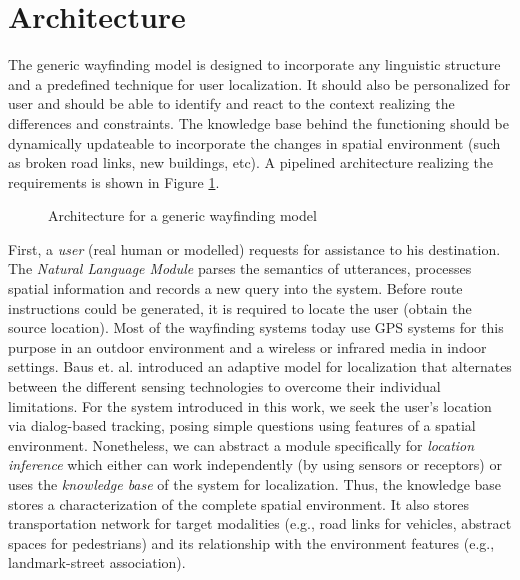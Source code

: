 \documentclass{iitkthesis}
\begin{document}
 \section{Architecture}
The generic wayfinding model is designed to incorporate any linguistic structure and a predefined technique for user localization. It should also be personalized for user and should be able to identify and react to the context realizing the differences and constraints. The knowledge base behind the functioning should be dynamically updateable to incorporate the changes in spatial environment (such as broken road links, new buildings, etc). A pipelined architecture realizing the requirements is shown in Figure \ref{fig:arc}. 
 \begin{figure}
\centering
\caption{Architecture for a generic wayfinding model}
\label{fig:arc}
 \end{figure}
First, a \textit{user} (real human or modelled) requests for assistance to his destination. The \textit{Natural Language Module} parses the semantics of utterances, processes spatial information and records a new query into the system. Before route instructions could be generated, it is required to locate the user (obtain the source location). Most of the wayfinding systems today use GPS systems for this purpose in an outdoor environment and a wireless or infrared media in indoor settings. Baus et. al. \cite{baus} introduced an adaptive model for localization that alternates between the different sensing technologies to overcome their individual limitations. For the system introduced in this work, we seek the user's location via dialog-based tracking, posing simple questions using features of a spatial environment. Nonetheless, we can abstract a module specifically for \textit{location inference} which either can work independently (by using sensors or receptors) or uses the \textit{knowledge base} of the system for localization. Thus, the knowledge base stores a characterization of the complete spatial environment. It also stores transportation network for target modalities (e.g., road links for vehicles, abstract spaces for pedestrians) and its relationship with the environment features (e.g., landmark-street association).
\end{document}
